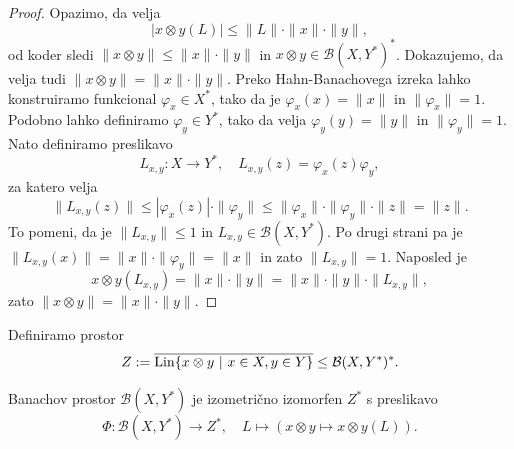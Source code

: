 \begin{proof}
    Opazimo, da velja $$| x \otimes y (L)| \leq \| L\| \cdot \| x\| \cdot \| y\|,$$
    od koder sledi $\| x \otimes y\| \leq \| x\| \cdot \| y\|$ in $x \otimes y \in \mathcal{B} (X, Y^*)^*$.
    Dokazujemo, da velja tudi $\| x \otimes y \| = \| x\| \cdot \| y\|$. 
    Preko Hahn-Banachovega izreka lahko konstruiramo funkcional 
    $\varphi_x \in X^*$, tako da je $\varphi_x (x) = \| x\|$ in $\| \varphi_x \| = 1$. 
    Podobno lahko definiramo $\varphi_y \in Y^*$, tako da velja $\varphi_y (y) = \| y\|$ in $\| \varphi_y \| = 1$. 
    Nato definiramo preslikavo $$L_{x, y}: X \to Y^*,\quad L_{x, y} (z) = \varphi_x (z) \varphi_y,$$
    za katero velja
    $$\| L_{x, y} (z)\| \leq | \varphi_x (z) | \cdot \| \varphi_y \| \leq \| \varphi_x\| \cdot \| \varphi_ y\| \cdot \| z\| = \| z\|.$$
    To pomeni, da je $\| L_{x, y} \| \leq 1$ in $L_{x, y} \in \mathcal{B}(X, Y^*)$. Po drugi strani pa je $\| L_{x, y} (x)\| = \| x\| \cdot \| \varphi_y \| = \| x\|$
    in zato $\| L_{x, y} \| = 1$.
    Naposled je
    $$x \otimes y (L_{x, y}) = \| x\| \cdot \| y\| = \| x\| \cdot \| y\| \cdot \| L_{x, y} \|,$$
    zato $\| x \otimes y\| = \| x\| \cdot \| y\|$. 
\end{proof}
 
Definiramo prostor
$$Z := \overline{\operatorname{Lin} \{x \otimes y\ |\ x \in X, y \in Y\}} \leq \mathcal{B} (X, Y^*)^*.$$
\begin{lema}
    Banachov prostor $\mathcal{B} (X, Y^*)$ je izometrično izomorfen $Z^*$ s preslikavo
    $$\Phi: \mathcal{B}(X, Y^*) \to Z^*,\quad L \mapsto (x \otimes y \mapsto x \otimes y (L)).$$
\end{lema}

